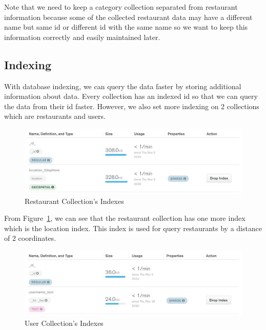 \documentclass[12pt,oneside,openright,a4paper]{cpe-english-project}
\begin{document}
Note that we need to keep a category collection separated from restaurant information because some of the collected restaurant data may have a different name but same id or different id with the same name so we want to keep this information correctly and easily maintained later.


\subsection{Indexing}

With database indexing, we can query the data faster by storing additional information about data. Every collection has an indexed id so that we can query the data from their id faster. However, we also set more indexing on 2 collections which are restaurants and users.

\begin{figure}[H]\centering
\includegraphics[width=400pt]{./images/3db_RestaurantCollectionsIndexes.png}
\caption{Restaurant Collection’s Indexes}\label{fig:3db_RestaurantCollectionsIndexes}
\end{figure}\vspace{-24pt}

From Figure~\ref{fig:3db_RestaurantCollectionsIndexes}, we can see that the restaurant collection has one more index which is the location index. This index is used for query restaurants by a distance of 2 coordinates.
\begin{figure}[H]\centering
\includegraphics[width=400pt]{./images/3db_UserCollectionsIndexes.png}
\caption{User Collection’s Indexes}\label{fig:3db_UserCollectionsIndexes}
\end{figure}\vspace{-24pt}
\end{document}
